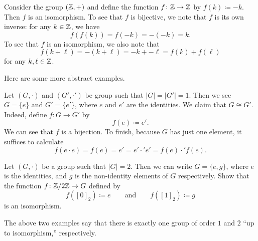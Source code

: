 \documentclass[../notes.tex]{subfiles}
\begin{document}
\begin{example}
    Consider the group $(\mathbb Z,+)$ and define the function $f\colon\mathbb Z\to\mathbb Z$ by $f(k)\coloneqq-k$. Then $f$ is an isomorphism. To see that $f$ is bijective, we note that $f$ is its own inverse: for any $k\in\mathbb Z$, we have
    \[f(f(k))=f(-k)=-(-k)=k.\]
    To see that $f$ is an isomorphism, we also note that
    \[f(k+\ell)=-(k+\ell)=-k+-\ell=f(k)+f(\ell)\]
    for any $k,\ell\in\mathbb Z$.
\end{example}
Here are some more abstract examples.
\begin{example} \label{ex:groups-of-ord-1}
    Let $(G,\cdot)$ and $(G',\cdot')$ be group such that $|G|=|G'|=1$. Then we see $G=\{e\}$ and $G'=\{e'\}$, where $e$ and $e'$ are the identities. We claim that $G\cong G'$. Indeed, define $f\colon G\to G'$ by
    \[f(e)\coloneqq e'.\]
    We can see that $f$ is a bijection. To finish, because $G$ has just one element, it suffices to calculate
    \[f(e\cdot e)=f(e)=e'=e'\cdot'e'=f(e)\cdot'f(e).\]
\end{example}
\begin{exe} \label{exe:groups-of-order-2}
    Let $(G,\cdot)$ be a group such that $|G|=2$. Then we can write $G=\{e,g\}$, where $e$ is the identities, and $g$ is the non-identity elements of $G$ respectively. Show that the function $f\colon\mathbb Z/2\mathbb Z\to G$ defined by
    \[f([0]_2)\coloneqq e\qquad\text{and}\qquad f([1]_2)\coloneqq g\]
    is an isomorphism.
\end{exe}
The above two examples say that there is exactly one group of order $1$ and $2$ ``up to isomorphism,'' respectively.
\end{document}
